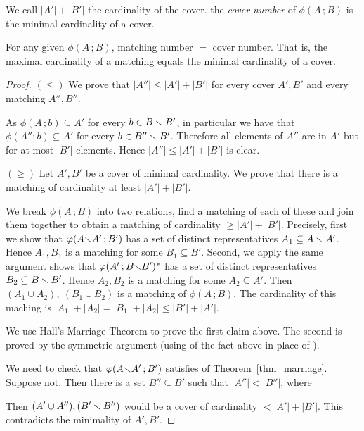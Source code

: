 \documentclass[scombinatorics.tex]{subfiles}
\begin{document}
We call $|A'|+|B'|$ the cardinality of the cover.
the \emph{cover number\/} of $\phi(A\,;B)$ is the minimal cardinality of a cover.


\begin{void_thm}
   For any given  $\phi(A\,;B)$, matching number $=$ cover number.
   That is, the maximal cardinality of a matching equals the minimal cardinality of a cover.
\end{void_thm}

\begin{proof}
   $(\le)$ 
   We prove that $|A''|\le|A'|+|B'|$ for every cover $A',B'$ and every matching $A'',B''$.

   As  $\phi(A\,;b)\subseteq A'$ for every $b\in B\smallsetminus B'$, in particular we have that $\phi(A'';b)\subseteq A'$ for every $b\in B''\smallsetminus B'$.
   Therefore all elements of $A''$ are in $A'$ but for at most $|B'|$ elements. 
   Hence $|A''|\le|A'|+|B'|$ is clear.


   $(\ge)$ 
   Let $A',B'$ be a cover of minimal cardinality. 
   We prove that there is a matching of cardinality at least $|A'|+|B'|$.

   We break $\phi(A\,;B)$ into two relations, find a matching of each of these and join them together to obtain a matching of cardinality $\ge|A'|+|B'|$.
   Precisely, first we show that $\varphi(A{\smallsetminus} A'\,;B')$ has a set of distinct representatives $A_1\subseteq A\smallsetminus A'$.
   Hence $A_1,B_1$ is a matching for some $B_1\subseteq B'$.
   Second, we apply the same argument shows that $\varphi(A'\,;B{\smallsetminus} B')^*$ has a  set of distinct representatives $B_2\subseteq B\smallsetminus B'$.
   Hence $A_2,B_2$ is a matching for some $A_2\subseteq A'$.
   Then $(A_1\cup A_2),\ (B_1\cup B_2)$ is a matching of  $\phi(A\,;B)$.
   The cardinality of this maching is $|A_1|+|A_2|=|B_1|+|A_2|\le|B'|+|A'|$.
   
   We use Hall's Marriage Theorem to prove the first claim above.
   The second is proved by the symmetric argument (using  of the fact above in place of ). 

   We need to check that $\varphi(A{\smallsetminus} A'\,;B')$ satisfies  of Theorem~\ref{thm_marriage}.
   Suppose not. Then there is a set $B''\subseteq B'$ such that $|A''|<|B''|$, where


   Then $(A'\cup A''), (B'\smallsetminus B'')$ would be a cover of cardinality $<|A'|+|B'|$.
   This contradicts the minimality of $A',B'$.
\end{proof}
\end{document}
